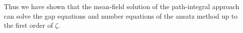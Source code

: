 Thus we have shown that the mean-field solution of the path-integral approach can solve the gap equations and number equations of the ansatz method up to the first order of $\zeta$. 












































